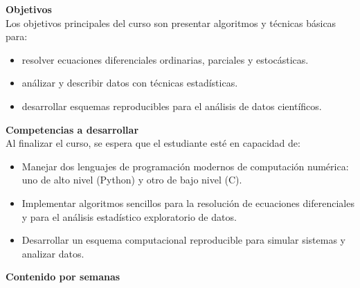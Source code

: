 \documentclass[letterpaper,10pt,onecolumn]{article}
\begin{document}
\noindent\textbf{\large {} \quad Objetivos}\\[-0.2cm]

\noindent\normalsize Los objetivos principales del curso son presentar
algoritmos y t\'ecnicas b\'asicas para:

\begin{itemize}
\item resolver ecuaciones
  diferenciales ordinarias, parciales y estoc\'asticas. \\[-0.6cm]
\item an\'alizar y describir datos con t\'ecnicas estad\'isticas. \\[-0.6cm]
\item desarrollar esquemas reproducibles para el an\'alisis de datos cient\'ificos. \\[-0.6cm]
\end{itemize}

\noindent\textbf{\large {} \quad Competencias a
  desarrollar}\\[-0.2cm] 


\noindent\normalsize Al finalizar el curso, se espera que el
estudiante est\'e en capacidad de: 

\begin{itemize}
\item Manejar dos lenguajes de programaci\'on modernos de
  computaci\'on num\'erica: uno de alto
  nivel (Python) y otro de bajo nivel (C).\\[-0.6cm] 
\item Implementar algoritmos sencillos para la resoluci\'on de
  ecuaciones diferenciales y para el an\'alisis estad\'istico
  exploratorio de datos. \\[-0.6cm]  
\item Desarrollar un esquema computacional reproducible para simular
  sistemas y analizar datos. \\[-0.6cm] 
\end{itemize}

\noindent\textbf{\large {} \quad Contenido por
  semanas}\\[-0.2cm] 

\end{document}
